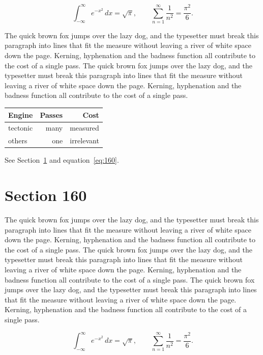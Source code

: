 \documentclass{article}
\begin{document}
\begin{equation}\label{eq:159}
\int_{-\infty}^{\infty} e^{-x^{2}}\,dx = \sqrt{\pi}, \qquad
\sum_{n=1}^{\infty} \frac{1}{n^{2}} = \frac{\pi^{2}}{6}.
\end{equation}

The quick brown fox jumps over the lazy dog, and the typesetter must break this paragraph into lines that fit the measure without leaving a river of white space down the page. Kerning, hyphenation and the badness function all contribute to the cost of a single pass. The quick brown fox jumps over the lazy dog, and the typesetter must break this paragraph into lines that fit the measure without leaving a river of white space down the page. Kerning, hyphenation and the badness function all contribute to the cost of a single pass. 

\begin{center}
\begin{tabular}{lrr}
\toprule
Engine & Passes & Cost \\
\midrule
tectonic & many & measured \\
others & one & irrelevant \\
\bottomrule
\end{tabular}
\end{center}

See Section~\ref{sec:160} and equation~\eqref{eq:160}.
\section{Section 160}
\label{sec:160}
The quick brown fox jumps over the lazy dog, and the typesetter must break this paragraph into lines that fit the measure without leaving a river of white space down the page. Kerning, hyphenation and the badness function all contribute to the cost of a single pass. The quick brown fox jumps over the lazy dog, and the typesetter must break this paragraph into lines that fit the measure without leaving a river of white space down the page. Kerning, hyphenation and the badness function all contribute to the cost of a single pass. The quick brown fox jumps over the lazy dog, and the typesetter must break this paragraph into lines that fit the measure without leaving a river of white space down the page. Kerning, hyphenation and the badness function all contribute to the cost of a single pass. 

\begin{equation}\label{eq:160}
\int_{-\infty}^{\infty} e^{-x^{2}}\,dx = \sqrt{\pi}, \qquad
\sum_{n=1}^{\infty} \frac{1}{n^{2}} = \frac{\pi^{2}}{6}.
\end{equation}
\end{document}
